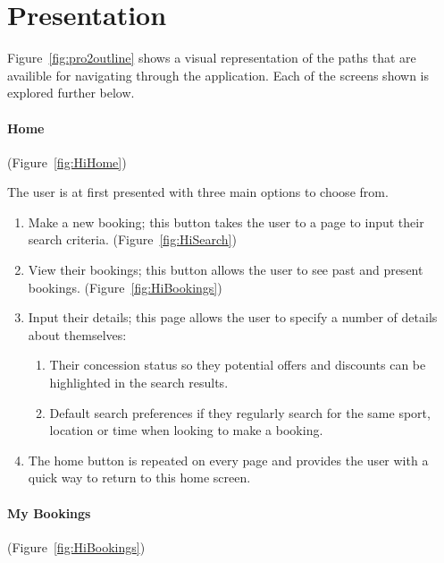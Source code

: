 \section{Presentation}

Figure~\ref{fig:pro2outline} shows a visual representation of the paths that
are availible for navigating through the application. Each of the screens shown
is explored further below.

\paragraph{Home} (Figure~\ref{fig:HiHome})


The user is at first presented with three main options to choose from.
\begin{enumerate}
	\item Make a new booking; this button takes the user to a page to input
		their search criteria. (Figure~\ref{fig:HiSearch})
	\item View their bookings; this button allows the user to see past and
		present bookings. (Figure~\ref{fig:HiBookings})
	\item Input their details; this page allows the user to specify a number
		of details about themselves:

		\begin{enumerate}
			\item Their concession status so they potential offers and
				discounts can be highlighted in the search results.
			\item Default search preferences if they regularly search for the
				same sport, location or time when looking to make a booking.
		\end{enumerate}
	\item The home button is repeated on every page and provides the user with
		a quick way to return to this home screen.
\end{enumerate}

\paragraph{My Bookings} (Figure~\ref{fig:HiBookings})

